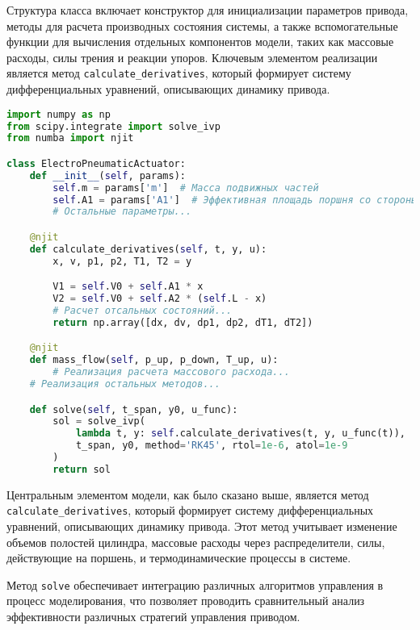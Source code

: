 Структура класса включает конструктор для инициализации параметров привода, методы для расчета производных состояния системы,
а также вспомогательные функции для вычисления отдельных компонентов модели, таких как массовые расходы, силы трения и реакции упоров.
Ключевым элементом реализации является метод \texttt{calculate\_derivatives}, который формирует систему дифференциальных уравнений,
описывающих динамику привода.

\begin{ListingEnv}[!h]%
    \captiondelim{ } %
    \caption{ \protect\python}\label{lst:hwbeauty}
    \begin{lstlisting}[language={Python}]
import numpy as np
from scipy.integrate import solve_ivp
from numba import njit

class ElectroPneumaticActuator:
    def __init__(self, params):
        self.m = params['m']  # Масса подвижных частей
        self.A1 = params['A1']  # Эффективная площадь поршня со стороны штока
        # Остальные параметры...

    @njit
    def calculate_derivatives(self, t, y, u):
        x, v, p1, p2, T1, T2 = y

        V1 = self.V0 + self.A1 * x
        V2 = self.V0 + self.A2 * (self.L - x)
        # Расчет отсальных состояний...
        return np.array([dx, dv, dp1, dp2, dT1, dT2])

    @njit
    def mass_flow(self, p_up, p_down, T_up, u):
        # Реализация расчета массового расхода...
    # Реализация остальных методов...

    def solve(self, t_span, y0, u_func):
        sol = solve_ivp(
            lambda t, y: self.calculate_derivatives(t, y, u_func(t)),
            t_span, y0, method='RK45', rtol=1e-6, atol=1e-9
        )
        return sol
    \end{lstlisting}
\end{ListingEnv}%

Центральным элементом модели, как было сказано выше, является метод \texttt{calculate\_derivatives},
который формирует систему дифференциальных уравнений, описывающих динамику привода.
Этот метод учитывает изменение объемов полостей цилиндра, массовые расходы через
распределители, силы, действующие на поршень, и термодинамические процессы в системе.

Метод \texttt{solve} обеспечивает интеграцию различных алгоритмов управления в процесс моделирования,
что позволяет проводить сравнительный анализ эффективности различных стратегий управления приводом.

